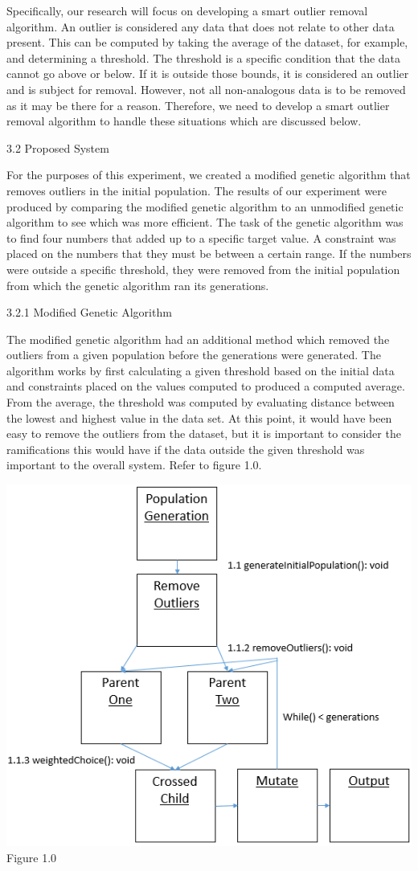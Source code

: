 \documentclass[conference]{IEEEtran}
\begin{document}
Specifically, our research will focus on developing a smart outlier removal algorithm. An outlier is considered any data that does not relate to other data present. This can be computed by taking the average of the dataset, for example, and determining a threshold. The threshold is a specific condition that the data cannot go above or below. If it is outside those bounds, it is considered an outlier and is subject for removal. However, not all non-analogous data is to be removed as it may be there for a reason. Therefore, we need to develop a smart outlier removal algorithm to handle these situations which are discussed below. 

3.2 Proposed System

For the purposes of this experiment, we created a modified genetic algorithm that removes outliers in the initial population. The results of our experiment were produced by comparing the modified genetic algorithm to an unmodified genetic algorithm to see which was more efficient. The task of the genetic algorithm was to find four numbers that added up to a specific target value. A constraint was placed on the numbers that they must be between a certain range. If the numbers were outside a specific threshold, they were removed from the initial population from which the genetic algorithm ran its generations. 

3.2.1 Modified Genetic Algorithm

The modified genetic algorithm had an additional method which removed the outliers from a given population before the generations were generated. The algorithm works by first calculating a given threshold based on the initial data and constraints placed on the values computed to produced a computed average. From the average, the threshold was computed by evaluating distance between the lowest and highest value in the data set. At this point, it would have been easy to remove the outliers from the dataset, but it is important to consider the ramifications this would have if the data outside the given threshold was important to the overall system. Refer to figure 1.0.

\includegraphics[scale=0.5]{Collab}
Figure 1.0
\end{document}
